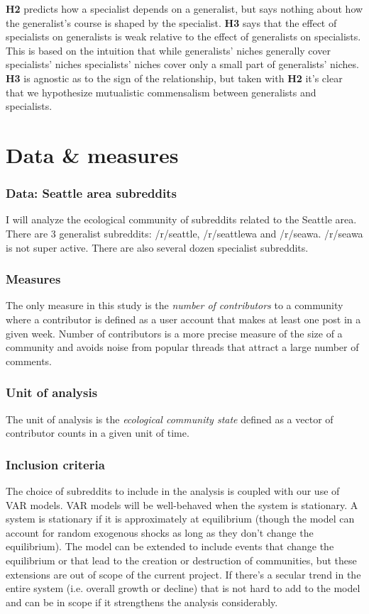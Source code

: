 \documentclass[12pt]{memoir}
\begin{document}
\textbf{H2} predicts how a specialist depends on a generalist, but says nothing about how the generalist's course is shaped by the specialist.    \textbf{H3} says that the effect of specialists on generalists is weak relative to the effect of generalists on specialists.  This is based on the intuition that while generalists' niches generally cover specialists' niches specialists' niches cover only a small part of generalists' niches.  \textbf{H3} is agnostic as to the sign of the relationship, but taken with \textbf{H2} it's clear that we hypothesize mutualistic commensalism between generalists and specialists.

\section{Data \& measures}

\subsubsection{Data: Seattle area subreddits}

I will analyze the ecological community of subreddits related to the Seattle area.  There are 3 generalist subreddits: /r/seattle, /r/seattlewa and /r/seawa. /r/seawa is not super active.  There are also several dozen specialist subreddits.

 \subsubsection{Measures}
 The only measure in this study is the \emph{number of contributors} to a community where a contributor is defined as a user account that makes at least one post in a given week. Number of contributors is a more precise measure of the size of a community and avoids noise from popular threads that attract a large number of comments. 

 \subsubsection{Unit of analysis}
 
The unit of analysis is the \emph{ecological community state} defined as a vector of contributor counts in a given unit of time. 

\subsubsection{Inclusion criteria}
The choice of subreddits to include in the analysis is coupled with our use of VAR models.  VAR models will be well-behaved when the system is stationary.  A system is stationary if it is approximately at equilibrium (though the model can account for random exogenous shocks as long as they don't change the equilibrium).  The model can be extended to include events that change the equilibrium or that lead to the creation or destruction of communities, but these extensions are out of scope of the current project.  If there's a secular trend in the entire system (i.e. overall growth or decline) that is not hard to add to the model and can be in scope if it strengthens the analysis considerably. 
\end{document}
